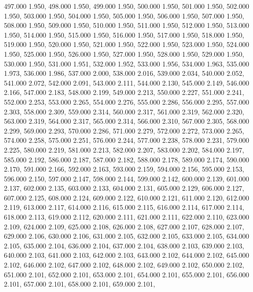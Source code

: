 497.000 1.950, 
498.000 1.950, 
499.000 1.950, 
500.000 1.950, 
501.000 1.950, 
502.000 1.950, 
503.000 1.950, 
504.000 1.950, 
505.000 1.950, 
506.000 1.950, 
507.000 1.950, 
508.000 1.950, 
509.000 1.950, 
510.000 1.950, 
511.000 1.950, 
512.000 1.950, 
513.000 1.950, 
514.000 1.950, 
515.000 1.950, 
516.000 1.950, 
517.000 1.950, 
518.000 1.950, 
519.000 1.950, 
520.000 1.950, 
521.000 1.950, 
522.000 1.950, 
523.000 1.950, 
524.000 1.950, 
525.000 1.950, 
526.000 1.950, 
527.000 1.950, 
528.000 1.950, 
529.000 1.950, 
530.000 1.950, 
531.000 1.951, 
532.000 1.952, 
533.000 1.956, 
534.000 1.963, 
535.000 1.973, 
536.000 1.986, 
537.000 2.000, 
538.000 2.016, 
539.000 2.034, 
540.000 2.052, 
541.000 2.072, 
542.000 2.091, 
543.000 2.111, 
544.000 2.130, 
545.000 2.149, 
546.000 2.166, 
547.000 2.183, 
548.000 2.199, 
549.000 2.213, 
550.000 2.227, 
551.000 2.241, 
552.000 2.253, 
553.000 2.265, 
554.000 2.276, 
555.000 2.286, 
556.000 2.295, 
557.000 2.303, 
558.000 2.309, 
559.000 2.314, 
560.000 2.317, 
561.000 2.319, 
562.000 2.320, 
563.000 2.319, 
564.000 2.317, 
565.000 2.314, 
566.000 2.310, 
567.000 2.305, 
568.000 2.299, 
569.000 2.293, 
570.000 2.286, 
571.000 2.279, 
572.000 2.272, 
573.000 2.265, 
574.000 2.258, 
575.000 2.251, 
576.000 2.244, 
577.000 2.238, 
578.000 2.231, 
579.000 2.225, 
580.000 2.219, 
581.000 2.213, 
582.000 2.207, 
583.000 2.202, 
584.000 2.197, 
585.000 2.192, 
586.000 2.187, 
587.000 2.182, 
588.000 2.178, 
589.000 2.174, 
590.000 2.170, 
591.000 2.166, 
592.000 2.163, 
593.000 2.159, 
594.000 2.156, 
595.000 2.153, 
596.000 2.150, 
597.000 2.147, 
598.000 2.144, 
599.000 2.142, 
600.000 2.139, 
601.000 2.137, 
602.000 2.135, 
603.000 2.133, 
604.000 2.131, 
605.000 2.129, 
606.000 2.127, 
607.000 2.125, 
608.000 2.124, 
609.000 2.122, 
610.000 2.121, 
611.000 2.120, 
612.000 2.119, 
613.000 2.117, 
614.000 2.116, 
615.000 2.115, 
616.000 2.114, 
617.000 2.114, 
618.000 2.113, 
619.000 2.112, 
620.000 2.111, 
621.000 2.111, 
622.000 2.110, 
623.000 2.109, 
624.000 2.109, 
625.000 2.108, 
626.000 2.108, 
627.000 2.107, 
628.000 2.107, 
629.000 2.106, 
630.000 2.106, 
631.000 2.105, 
632.000 2.105, 
633.000 2.105, 
634.000 2.105, 
635.000 2.104, 
636.000 2.104, 
637.000 2.104, 
638.000 2.103, 
639.000 2.103, 
640.000 2.103, 
641.000 2.103, 
642.000 2.103, 
643.000 2.102, 
644.000 2.102, 
645.000 2.102, 
646.000 2.102, 
647.000 2.102, 
648.000 2.102, 
649.000 2.102, 
650.000 2.102, 
651.000 2.101, 
652.000 2.101, 
653.000 2.101, 
654.000 2.101, 
655.000 2.101, 
656.000 2.101, 
657.000 2.101, 
658.000 2.101, 
659.000 2.101, 
